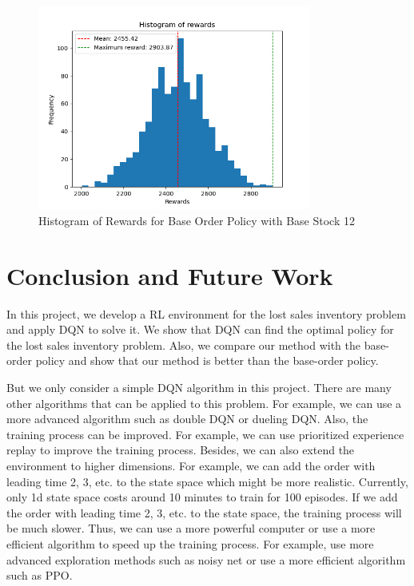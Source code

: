 \begin{figure}[H]
    \centering
    \includegraphics[width=0.8\textwidth]{figure/Histogram of rewards - Base 12.png}
    \caption{Histogram of Rewards for Base Order Policy with Base Stock 12}
    \label{fig:hist-base-12}
\end{figure}


\section{Conclusion and Future Work}
In this project, we develop a RL environment for the lost sales inventory problem and apply DQN to solve it. We show that DQN can find the optimal policy for the lost sales inventory problem. Also, we compare our method with the base-order policy and show that our method is better than the base-order policy. 

But we only consider a simple DQN algorithm in this project. There are many other algorithms that can be applied to this problem. For example, we can use a more advanced algorithm such as double DQN or dueling DQN. Also, the training process can be improved. For example, we can use prioritized experience replay to improve the training process. Besides, we can also extend the environment to higher dimensions. For example, we can add the order with leading time 2, 3, etc. to the state space which might be more realistic. Currently, only 1d state space costs around 10 minutes to train for 100 episodes. If we add the order with leading time 2, 3, etc. to the state space, the training process will be much slower. Thus, we can use a more powerful computer or use a more efficient algorithm to speed up the training process. For example, use more advanced exploration methods such as noisy net or use a more efficient algorithm such as PPO.
